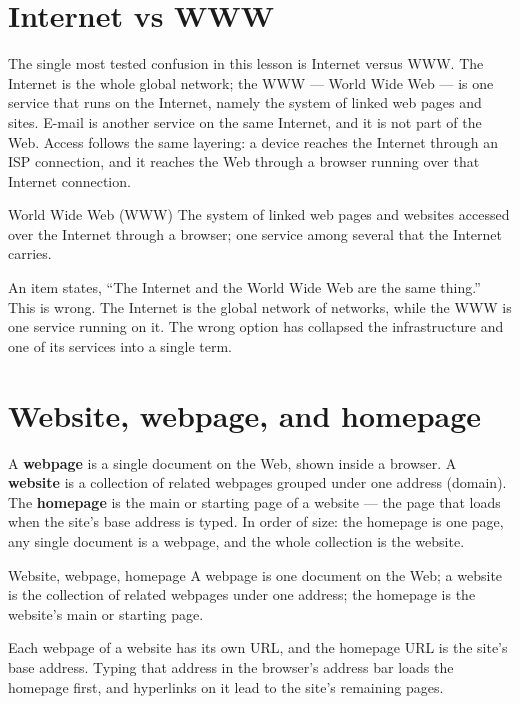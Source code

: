 \section{Internet vs WWW}
The single most tested confusion in this lesson is Internet versus WWW. The
Internet is the whole global network; the WWW --- World Wide Web --- is one
service that runs on the Internet, namely the system of linked web pages and
sites. E-mail is another service on the same Internet, and it is not part of
the Web. Access follows the same layering: a device reaches the Internet
through an ISP connection, and it reaches the Web through a browser running
over that Internet connection.

\begin{definitionbox}{World Wide Web (WWW)}
The system of linked web pages and websites accessed over the Internet
through a browser; one service among several that the Internet carries.
\end{definitionbox}

\begin{example}
An item states, ``The Internet and the World Wide Web are the same thing.''
This is wrong. The Internet is the global network of networks, while the WWW
is one service running on it. The wrong option has collapsed the
infrastructure and one of its services into a single term.
\end{example}

\section{Website, webpage, and homepage}
A \textbf{webpage} is a single document on the Web, shown inside a browser.
A \textbf{website} is a collection of related webpages grouped under one
address (domain). The \textbf{homepage} is the main or starting page of a
website --- the page that loads when the site's base address is typed. In
order of size: the homepage is one page, any single document is a webpage,
and the whole collection is the website.

\begin{definitionbox}{Website, webpage, homepage}
A webpage is one document on the Web; a website is the collection of related
webpages under one address; the homepage is the website's main or starting
page.
\end{definitionbox}

Each webpage of a website has its own URL, and the homepage URL is the
site's base address. Typing that address in the browser's address bar loads
the homepage first, and hyperlinks on it lead to the site's remaining pages.

